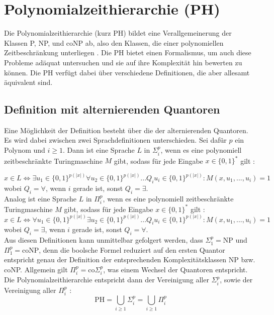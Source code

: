 \chapter{Polynomialzeithierarchie (PH)} \label{chapter: Polynomialzeithierarchie (PH)}
Die Polynomialzeithierarchie (kurz PH) bildet eine Verallgemeinerung der Klassen P, NP, und coNP ab, also den Klassen, die einer 
polynomiellen Zeitbeschränkung unterliegen \cite{aaronson_scott_2016}. Die PH bietet einen Formalismus, um auch diese Probleme adäquat untersuchen und sie auf ihre Komplexität hin bewerten zu können. Die PH verfügt dabei über verschiedene Definitionen, die aber allesamt äquivalent sind.



\section{Definition mit alternierenden Quantoren} \label{section: Definition PH mit alternierenden Quantoren}
Eine Möglichkeit der Definition besteht über die der alternierenden Quantoren. Es wird dabei zwischen zwei Sprachdefinitionen unterschieden.
Sei dafür $p$ ein Polynom und $i \geq 1$. Dann ist eine Sprache $L$ in $\Sigma^p_i$, wenn es eine polynomiell zeitbeschränkte Turingmaschine $M$ gibt, 
sodass für jede Eingabe $x \in \{0,1\}^*$ gilt \cite{rossman_complexity_2015}:

\begin{equation}
    x \in L \Leftrightarrow \exists u_1 \in \{0,1\}^{p(|x|)} \forall u_2 \in \{0,1\}^{p(|x|)} ... Q_i u_i \in \{0,1\}^{p(|x|)} : M(x, u_1, ..., u_i) = 1
\end{equation}
wobei $Q_i = \forall$, wenn $i$ gerade ist, sonst $Q_i = \exists$. \\
Analog ist eine Sprache $L$ in $\Pi^p_i$, wenn es eine polynomiell zeitbeschränkte Turingmaschine $M$ gibt, sodass für jede Eingabe $x \in \{0,1\}^*$ gilt \cite{arora_computational_2009}:
\begin{equation}
    x \in L \Leftrightarrow \forall u_1 \in \{0,1\}^{p(|x|)} \exists u_2 \in \{0,1\}^{p(|x|)} ... Q_i u_i \in \{0,1\}^{p(|x|)} : M(x, u_1, ..., u_i) = 1
\end{equation}
wobei $Q_i = \exists$, wenn $i$ gerade ist, sonst $Q_i = \forall$. \\
Aus diesen Definitionen kann unmittelbar gefolgert werden, dass $\Sigma^p_1 = \text{NP}$ und $\Pi^p_1 = \text{coNP}$, denn die boolsche Formel reduziert auf 
den ersten Quantor entspricht genau der Definition der entsprechenden Komplexitätsklassen NP bzw. coNP.
Allgemein gilt $\Pi^p_i = \text{co}\Sigma^p_i$, was einem Wechsel der Quantoren entspricht.
Die Polynomialzeithierarchie entspricht dann der Vereinigung aller $\Sigma^p_i$, sowie der Vereinigung aller $\Pi^p_i$ \cite{sipser_introduction_2012}:
\begin{equation}
    \text{PH} = \bigcup_{i \geq 1} \Sigma^p_i = \bigcup_{i \geq 1} \Pi^p_i 
\end{equation}
